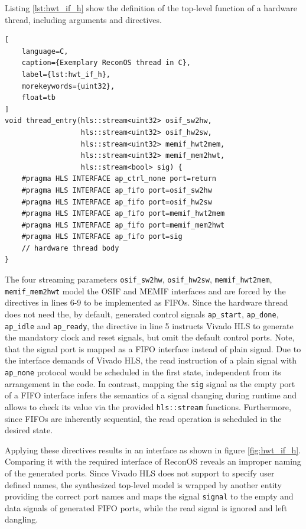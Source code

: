 Listing \ref{lst:hwt_if_h} show the definition of the top-level function of a
hardware thread, including arguments and directives.
\begin{lstlisting}[
	language=C,
	caption={Exemplary ReconOS thread in C},
	label={lst:hwt_if_h},
	morekeywords={uint32},
	float=tb
]
void thread_entry(hls::stream<uint32> osif_sw2hw,
                  hls::stream<uint32> osif_hw2sw,
                  hls::stream<uint32> memif_hwt2mem,
                  hls::stream<uint32> memif_mem2hwt,
                  hls::stream<bool> sig) {
	#pragma HLS INTERFACE ap_ctrl_none port=return
	#pragma HLS INTERFACE ap_fifo port=osif_sw2hw
	#pragma HLS INTERFACE ap_fifo port=osif_hw2sw
	#pragma HLS INTERFACE ap_fifo port=memif_hwt2mem
	#pragma HLS INTERFACE ap_fifo port=memif_mem2hwt
	#pragma HLS INTERFACE ap_fifo port=sig
	// hardware thread body
}
\end{lstlisting}
The four streaming parameters \lstinline{osif_sw2hw}, \lstinline{osif_hw2sw},
\lstinline{memif_hwt2mem}, \lstinline{memif_mem2hwt} model the \ac{OSIF} and
\ac{MEMIF} interfaces and are forced by the directives in lines 6-9 to be
implemented as \acp{FIFO}. Since the hardware thread does not need the, by
default, generated control signals \lstinline{ap_start}, \lstinline{ap_done},
\lstinline{ap_idle} and \lstinline{ap_ready}, the directive in line 5
instructs Vivado HLS to generate the mandatory clock and reset signals, but
omit the default control ports. Note, that the signal port is mapped as a
\ac{FIFO} interface instead of plain signal. Due to the interface demands of
Vivado HLS, the read instruction of a plain signal with \lstinline{ap_none}
protocol would be scheduled in the first state, independent from its
arrangement in the code. In contrast, mapping the \lstinline{sig} signal as
the empty port of a \ac{FIFO} interface infers the semantics of a signal
changing during runtime and allows to check its value via the provided
\lstinline{hls::stream} functions. Furthermore, since \acp{FIFO} are
inherently sequential, the read operation is scheduled in the desired state.

Applying these directives results in an interface as shown in figure
\ref{fig:hwt_if_h}. Comparing it with the required interface of ReconOS
reveals an improper naming of the generated ports. Since Vivado HLS does not
support to specify user defined names, the synthesized top-level model is
wrapped by another entity providing the correct port names and maps the signal
\lstinline{signal} to the empty and data signals of generated \ac{FIFO} ports,
while the read signal is ignored and left dangling.

